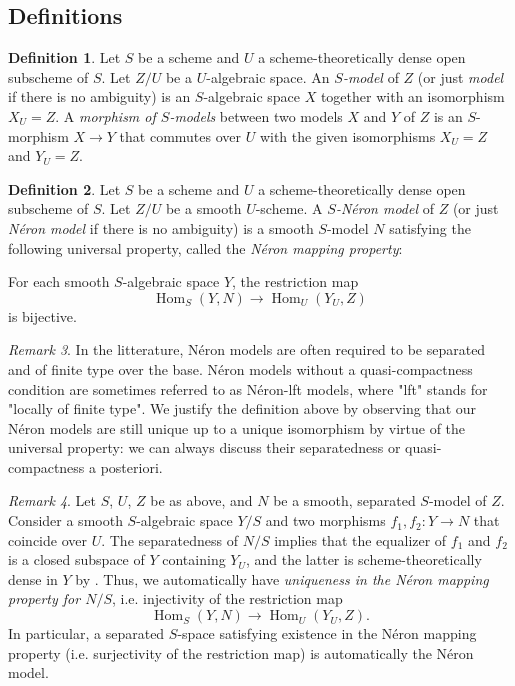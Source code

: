 \documentclass[a4paper,12pt]{amsart} %
\numberwithin{equation}{subsection}
\newcommand{\Hom}{\operatorname{Hom}}
\theoremstyle{definition}
\newtheorem{definition}{Definition}[section]
\theoremstyle{plain}%
\theoremstyle{remark}
\newtheorem{remark}[definition]{Remark}
\begin{document}
\subsection{Definitions}

\begin{definition}
	Let $S$ be a scheme and $U$ a scheme-theoretically dense open subscheme of $S$. Let $Z/U$ be a $U$-algebraic space. An \textit{$S$-model} of $Z$ (or just \textit{model} if there is no ambiguity) is an $S$-algebraic space $X$ together with an isomorphism $X_U=Z$. A \textit{morphism of $S$-models} between two models $X$ and $Y$ of $Z$ is an $S$-morphism $X\to Y$ that commutes over $U$ with the given isomorphisms $X_U=Z$ and $Y_U=Z$.
\end{definition}

\begin{definition}\label{definition:neron_models}
	Let $S$ be a scheme and $U$ a scheme-theoretically dense open subscheme of $S$. Let $Z/U$ be a smooth $U$-scheme. A \textit{$S$-Néron model} of $Z$ (or just \textit{Néron model} if there is no ambiguity) is a smooth $S$-model $N$ satisfying the following universal property, called the \textit{Néron mapping property}:
	
For each smooth $S$-algebraic space $Y$, the restriction map \[
\Hom_S(Y,N)\to\Hom_U(Y_U,Z)
\]
is bijective.
\end{definition}

\begin{remark}
In the litterature, N\'eron models are often required to be separated and of finite type over the base. Néron models without a quasi-compactness condition are sometimes referred to as N\'eron-lft models, where "lft" stands for "locally of finite type". We justify the definition above by observing that our Néron models are still unique up to a unique isomorphism by virtue of the universal property: we can always discuss their separatedness or quasi-compactness a posteriori.
\end{remark}

\begin{remark}
	Let $S$, $U$, $Z$ be as above, and $N$ be a smooth, separated $S$-model of $Z$. Consider a smooth $S$-algebraic space $Y/S$ and two morphisms $f_1,f_2\colon Y\to N$ that coincide over $U$. The separatedness of $N/S$ implies that the equalizer of $f_1$ and $f_2$ is a closed subspace of $Y$ containing $Y_U$, and the latter is scheme-theoretically dense in $Y$ by \cite[Théorème 11.10.5]{EGA4.3}. Thus, we automatically have \emph{uniqueness in the N\'eron mapping property for $N/S$}, i.e. injectivity of the restriction map
	\[
	\Hom_S(Y,N) \to \Hom_U(Y_U,Z).
	\]
In particular, a separated $S$-space satisfying existence in the N\'eron mapping property (i.e. surjectivity of the restriction map) is automatically the Néron model.
\end{remark}
\end{document}
